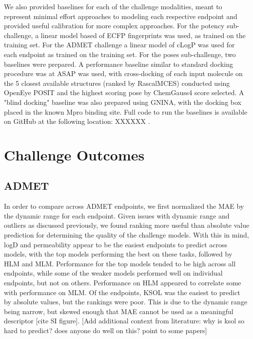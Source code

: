 \documentclass[journal=jcim,manuscript=article]{achemso}
\begin{document}
We also provided baselines for each of the challenge modalities, meant to represent minimal effort approaches to modeling each respective endpoint and provided useful calibration for more complex approaches. For the potency sub-challenge, a linear model based of ECFP fingerprints was used, as trained on the training set. For the ADMET challenge a linear model of cLogP was used for each endpoint as trained on the training set. For the poses sub-challenge, two baselines were prepared. A performance baseline similar to standard docking procedure was at ASAP was used, with cross-docking of each input molecule on the 5 closest available structures (ranked by RascalMCES) conducted using OpenEye POSIT and the highest scoring pose by ChemGauss4 score selected. A "blind docking" baseline was also prepared using GNINA, with the docking box placed in the known Mpro binding site. Full code to run the baselines is available on GitHub at the following location: XXXXXX . 



\section{Challenge Outcomes}
  
\subsection{ADMET}

In order to compare across ADMET endpoints, we first normalized the MAE by the dynamic range for each endpoint.  Given issues with dynamic range and outliers as discussed previously, we found ranking more useful than absolute value prediction for determining the quality of the challenge models.  With this in mind, logD and permeability appear to be the easiest endpoints to predict across models, with the top models performing the best on these tasks, followed by HLM and MLM.  Performance for the top models tended to be high across all endpoints, while some of the weaker models performed well on individual endpoints, but not on others.  Performance on HLM appeared to correlate some with performance on MLM.  Of the endpoints, KSOL was the easiest to predict by absolute values, but the rankings were poor.  This is due to the dynamic range being narrow, but skewed enough that MAE cannot be used as a meaningful descriptor [cite SI figure].  [Add additional context from literature: why is ksol so hard to predict? does anyone do well on this? point to some papers]    
\end{document}
